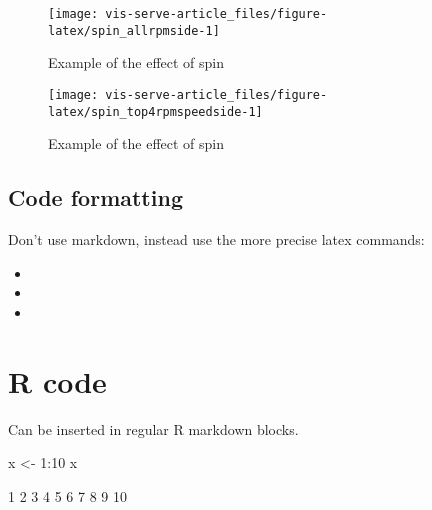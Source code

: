 \documentclass[article]{jss}
\providecommand{\tightlist}{%
  \setlength{\itemsep}{0pt}\setlength{\parskip}{0pt}}
\begin{document}
\begin{CodeChunk}
\begin{figure}

{\centering \texttt{[image: vis-serve-article\_files/figure-latex/spin\_allrpmside-1]} 

}

\caption[Example of the effect of spin]{Example of the effect of spin}\label{fig:spin_allrpmside}
\end{figure}
\end{CodeChunk}

\begin{CodeChunk}
\begin{figure}

{\centering \texttt{[image: vis-serve-article\_files/figure-latex/spin\_top4rpmspeedside-1]} 

}

\caption[Example of the effect of spin]{Example of the effect of spin}\label{fig:spin_top4rpmspeedside}
\end{figure}
\end{CodeChunk}

\subsection{Code formatting}\label{code-formatting}

Don't use markdown, instead use the more precise latex commands:

\begin{itemize}
\tightlist
\item
\item
\item
\end{itemize}

\section{R code}\label{r-code}

Can be inserted in regular R markdown blocks.

\begin{CodeChunk}
\begin{CodeInput}
x <- 1:10
x
\end{CodeInput}
\begin{CodeOutput}
 [1]  1  2  3  4  5  6  7  8  9 10
\end{CodeOutput}
\end{CodeChunk}
\end{document}
